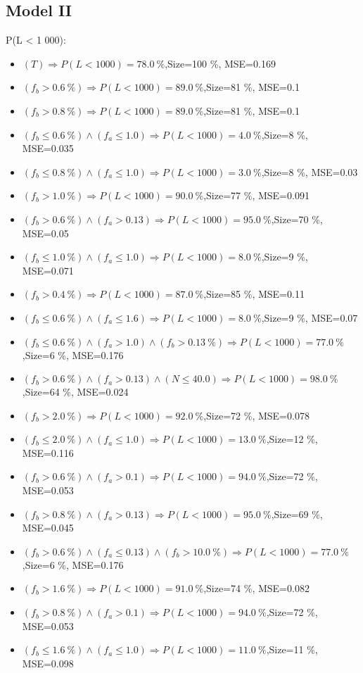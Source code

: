 \documentclass[numbered]{CSL}
\begin{document}
\subsection{Model II}
P(L < 1 000):
\begin{itemize}
\item $(T) \Rightarrow P(L < 1 000) = 78.0~\%$,\hfill Size=100 \%, MSE=0.169
\item $(f_b > 0.6~\%) \Rightarrow P(L < 1 000) = 89.0~\%$,\hfill Size=81 \%, MSE=0.1
\item $(f_b > 0.8~\%) \Rightarrow P(L < 1 000) = 89.0~\%$,\hfill Size=81 \%, MSE=0.1
\item $(f_b \leq 0.6~\%) \land (f_a \leq 1.0) \Rightarrow P(L < 1 000) = 4.0~\%$,\hfill Size=8 \%, MSE=0.035
\item $(f_b \leq 0.8~\%) \land (f_a \leq 1.0) \Rightarrow P(L < 1 000) = 3.0~\%$,\hfill Size=8 \%, MSE=0.03
\item $(f_b > 1.0~\%) \Rightarrow P(L < 1 000) = 90.0~\%$,\hfill Size=77 \%, MSE=0.091
\item $(f_b > 0.6~\%) \land (f_a > 0.13) \Rightarrow P(L < 1 000) = 95.0~\%$,\hfill Size=70 \%, MSE=0.05
\item $(f_b \leq 1.0~\%) \land (f_a \leq 1.0) \Rightarrow P(L < 1 000) = 8.0~\%$,\hfill Size=9 \%, MSE=0.071
\item $(f_b > 0.4~\%) \Rightarrow P(L < 1 000) = 87.0~\%$,\hfill Size=85 \%, MSE=0.11
\item $(f_b \leq 0.6~\%) \land (f_a \leq 1.6) \Rightarrow P(L < 1 000) = 8.0~\%$,\hfill Size=9 \%, MSE=0.07
\item $(f_b \leq 0.6~\%) \land (f_a > 1.0) \land (f_b > 0.13~\%) \Rightarrow P(L < 1 000) = 77.0~\%$,\hfill Size=6 \%, MSE=0.176
\item $(f_b > 0.6~\%) \land (f_a > 0.13) \land (N \leq 40.0) \Rightarrow P(L < 1 000) = 98.0~\%$,\hfill Size=64 \%, MSE=0.024
\item $(f_b > 2.0~\%) \Rightarrow P(L < 1 000) = 92.0~\%$,\hfill Size=72 \%, MSE=0.078
\item $(f_b \leq 2.0~\%) \land (f_a \leq 1.0) \Rightarrow P(L < 1 000) = 13.0~\%$,\hfill Size=12 \%, MSE=0.116
\item $(f_b > 0.6~\%) \land (f_a > 0.1) \Rightarrow P(L < 1 000) = 94.0~\%$,\hfill Size=72 \%, MSE=0.053
\item $(f_b > 0.8~\%) \land (f_a > 0.13) \Rightarrow P(L < 1 000) = 95.0~\%$,\hfill Size=69 \%, MSE=0.045
\item $(f_b > 0.6~\%) \land (f_a \leq 0.13) \land (f_b > 10.0~\%) \Rightarrow P(L < 1 000) = 77.0~\%$,\hfill Size=6 \%, MSE=0.176
\item $(f_b > 1.6~\%) \Rightarrow P(L < 1 000) = 91.0~\%$,\hfill Size=74 \%, MSE=0.082
\item $(f_b > 0.8~\%) \land (f_a > 0.1) \Rightarrow P(L < 1 000) = 94.0~\%$,\hfill Size=72 \%, MSE=0.053
\item $(f_b \leq 1.6~\%) \land (f_a \leq 1.0) \Rightarrow P(L < 1 000) = 11.0~\%$,\hfill Size=11 \%, MSE=0.098
\end{itemize}
\end{document}
